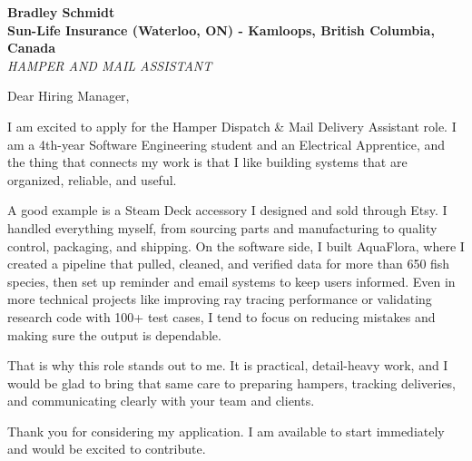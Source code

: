 \documentclass[11pt]{article}
\begin{document}
\textbf{Bradley Schmidt}\\
\vspace{0.5em}
\textbf{Sun-Life Insurance (Waterloo, ON) - Kamloops, British Columbia, Canada}\\
\textit{HAMPER AND MAIL ASSISTANT}

Dear Hiring Manager,

\par

I am excited to apply for the Hamper Dispatch \& Mail Delivery Assistant role. I am a 4th-year Software Engineering student and an Electrical Apprentice, and the thing that connects my work is that I like building systems that are organized, reliable, and useful.

\par

A good example is a Steam Deck accessory I designed and sold through Etsy. I handled everything myself, from sourcing parts and manufacturing to quality control, packaging, and shipping. On the software side, I built AquaFlora, where I created a pipeline that pulled, cleaned, and verified data for more than 650 fish species, then set up reminder and email systems to keep users informed. Even in more technical projects like improving ray tracing performance or validating research code with 100+ test cases, I tend to focus on reducing mistakes and making sure the output is dependable.

\par

That is why this role stands out to me. It is practical, detail-heavy work, and I would be glad to bring that same care to preparing hampers, tracking deliveries, and communicating clearly with your team and clients.

\par

Thank you for considering my application. I am available to start immediately and would be excited to contribute.
\end{document}
